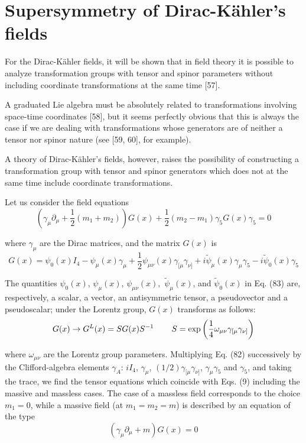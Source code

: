 \documentclass[a4paper,12pt]{article}
\begin{document}
\section{Supersymmetry of Dirac-K\"ahler's fields}

For the Dirac-K\"ahler fields, it will be shown that in field theory it is
possible to analyze transformation groups with tensor and spinor parameters
without including coordinate transformations at the same time [57].

A graduated Lie algebra must be absolutely related to transformations
involving space-time coordinates [58], but it seems perfectly obvious that
this is always the case if we are dealing with transformations whose
generators are of neither a tensor nor spinor nature (see [59, 60], for
example).

A theory of Dirac-K\"ahler's fields, however, raises the possibility of
constructing a transformation group with tensor and spinor generators which
does not at the same time include coordinate transformations.

Let us consider the field equations
\begin{equation}
\left( \gamma _\mu \partial _\mu +\frac 12\left( m_1+m_2\right) \right)
G(x)+\frac 12\left( m_2-m_1\right) \gamma _5G(x)\gamma _5=0  \label{82}
\end{equation}

where $\gamma _\mu $ are the Dirac matrices, and the matrix $G(x)$ is
\begin{equation}
G(x)=\psi _0(x)I_4-\psi _\mu (x)\gamma _\mu +\frac 12\psi _{\mu \nu
}(x)\gamma _{[\mu }\gamma _{\nu ]}+i\widetilde{\psi }_\mu (x)\gamma _\mu
\gamma _5-i\widetilde{\psi }_0(x)\gamma _5  \label{83}
\end{equation}

The quantities $\psi _0(x)$, $\psi _\mu (x)$, $\psi _{\mu \nu
}(x),$ $ \widetilde{\psi }_\mu (x)$, and $\widetilde{\psi }_0(x)$
in Eq. (83) are, respectively, a scalar, a vector, an
antisymmetric tensor, a pseudovector and a pseudoscalar; under the
Lorentz group, $G(x)$ transforms as follows:
\begin{equation}
G(x)\rightarrow G^L(x)=SG(x)S^{-1}\hspace{0.3in}S=\exp \left( \frac 14\omega
_{\mu \nu }\gamma _{[\mu }\gamma _{\nu ]}\right)  \label{84}
\end{equation}

where $\omega _{\mu \nu }$ are the Lorentz group parameters.
Multiplying Eq. (82) successively by the Clifford-algebra elements
$\gamma _A$: $iI_4$, $ \gamma _\mu $, $(1/2)\gamma _{[\mu }\gamma
_{\nu ]}$, $\gamma _\mu \gamma _5$ and $\gamma _5$, and taking the
trace, we find the tensor equations which coincide with Eqs. (9)
including the massive and massless cases. The case of a massless
field corresponds to the choice $m_1=0$, while a massive field (at
$m_1=m_2=m$) is described by an equation of the type
\begin{equation}
\left( \gamma _\mu \partial _\mu +m\right) G(x)=0  \label{85}
\end{equation}
\end{document}
